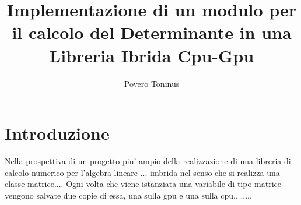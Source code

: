 \documentclass{article}
\title{Implementazione di un modulo per il calcolo del Determinante in una Libreria Ibrida Cpu-Gpu}
\author{Povero Toninus}
\begin{document}
\maketitle
\begin{abstract}

\end{abstract}

\section{Introduzione }
Nella prospettiva di un progetto piu' ampio della realizzazione di una libreria di calcolo numerico per l'algebra lineare ...
imbrida nel senso che si realizza una classe matrice....
Ogni volta che viene istanziata una variabile di tipo matrice vengono salvate due copie di essa, una sulla gpu e una sulla cpu..
.....

\end{document}

